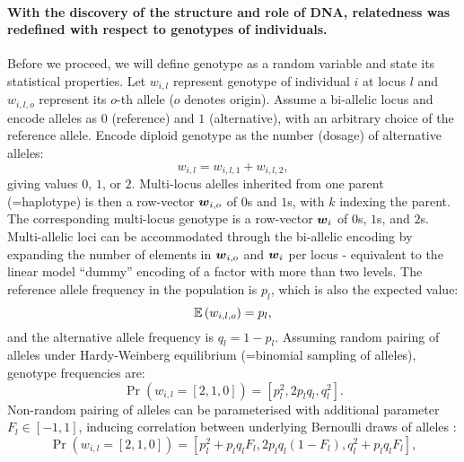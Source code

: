 \paragraph{With the discovery of the structure and role of DNA,
relatedness was redefined with respect to genotypes of individuals.}
%
Before we proceed, we will define genotype as a random variable and 
state its statistical properties.
%
Let $w_{i,l}$ represent genotype of individual $i$ at locus $l$ and
$w_{i,l,o}$ represent its $o$-th allele ($o$ denotes origin).
%
Assume a bi-allelic locus and encode alleles as $0$ (reference) and
$1$ (alternative), with an arbitrary choice of the reference allele.
%
Encode diploid genotype as the number (dosage) of alternative alleles:
%
\begin{equation} \label{eqn:dosage}
  w_{i,l} = w_{i,l,1} + w_{i,l,2},
\end{equation}
%
giving values $0$, $1$, or $2$.
%
Multi-locus alelles inherited from one parent (=haplotype) is then
a row-vector $\boldsymbol{w}_{i,o}$ of $0$s and $1$s, with $k$ indexing
the parent.
%
The corresponding multi-locus genotype is
a row-vector $\boldsymbol{w}_i$ of $0$s, $1$s, and $2$s.
%
Multi-allelic loci can be accommodated through the bi-allelic encoding by
expanding the number of elements in $\boldsymbol{w}_{i,o}$ and $\boldsymbol{w}_i$
per locus - equivalent to the linear model ``dummy'' encoding of a factor
with more than two levels.
%
The reference allele frequency in the population is $p_l$,
which is also the expected value:
%
\begin{equation} \label{eqn:allele_freq}
  \mathbb{E}\left(w_{i,l,o}\right)=p_l,
\end{equation} 
%
and the alternative allele frequency is $q_l = 1 - p_l$.
%
Assuming random pairing of alleles under Hardy-Weinberg equilibrium
(=binomial sampling of alleles), genotype frequencies are:
%
\begin{equation} \label{eqn:geno_prob_hwe}
  \Pr\left(w_{i,l} = \left[2, 1, 0\right]\right) =
    \left[p^2_l, 2 p_l q_l, q^2_l\right].
\end{equation}
%
Non-random pairing of alleles can be parameterised with additional
parameter $F_l \in [-1, 1]$, inducing correlation between underlying
Bernoulli draws of alleles
\citep{wright1921systems, wright1922coefficients, wright1949genetical}:
%
\begin{equation} \label{eqn:geno_prob_f}
  \Pr\left(w_{i,l} = \left[2, 1, 0\right]\right) =
    \left[p^2_l + p_l q_l F_l, 2 p_l q_l(1 - F_l), q^2_l + p_l q_l F_l\right],
\end{equation}
